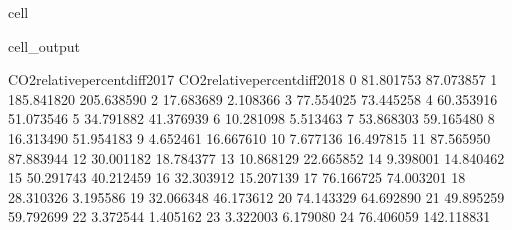 \documentclass[letterpaper,10pt,english]{jupyterBook}
\begin{document}
\begin{sphinxuseclass}{cell}
\begin{sphinxVerbatimOutput}
\begin{sphinxuseclass}{cell_output}
\begin{sphinxVerbatim}[commandchars=\\\{\}]
    CO2\PYGZus{}relative\PYGZus{}percent\PYGZus{}diff\PYGZus{}2017 CO2\PYGZus{}relative\PYGZus{}percent\PYGZus{}diff\PYGZus{}2018  \PYGZbs{}
0                       \PYGZhy{}81.801753                     \PYGZhy{}87.073857   
1                      \PYGZhy{}185.841820                    \PYGZhy{}205.638590   
2                       \PYGZhy{}17.683689                      \PYGZhy{}2.108366   
3                        77.554025                      73.445258   
4                        60.353916                      51.073546   
5                       \PYGZhy{}34.791882                     \PYGZhy{}41.376939   
6                       \PYGZhy{}10.281098                       5.513463   
7                        53.868303                      59.165480   
8                        16.313490                      51.954183   
9                         4.652461                     \PYGZhy{}16.667610   
10                        7.677136                      16.497815   
11                       87.565950                      87.883944   
12                       30.001182                      18.784377   
13                      \PYGZhy{}10.868129                     \PYGZhy{}22.665852   
14                        9.398001                      14.840462   
15                       50.291743                      40.212459   
16                      \PYGZhy{}32.303912                     \PYGZhy{}15.207139   
17                       76.166725                      74.003201   
18                      \PYGZhy{}28.310326                      \PYGZhy{}3.195586   
19                       32.066348                      46.173612   
20                      \PYGZhy{}74.143329                     \PYGZhy{}64.692890   
21                       49.895259                      59.792699   
22                       \PYGZhy{}3.372544                       1.405162   
23                        3.322003                       6.179080   
24                       76.406059                     142.118831   


\end{sphinxVerbatim}
\end{sphinxuseclass}
\end{sphinxVerbatimOutput}
\end{sphinxuseclass}
\end{document}
